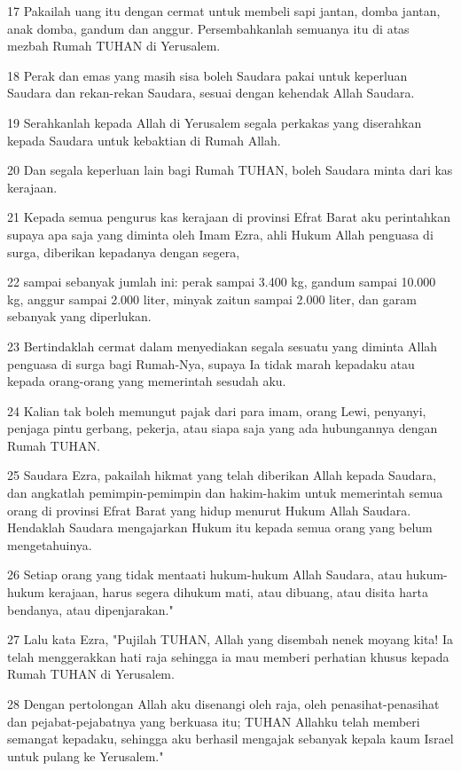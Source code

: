 \par 17 Pakailah uang itu dengan cermat untuk membeli sapi jantan, domba jantan, anak domba, gandum dan anggur. Persembahkanlah semuanya itu di atas mezbah Rumah TUHAN di Yerusalem.
\par 18 Perak dan emas yang masih sisa boleh Saudara pakai untuk keperluan Saudara dan rekan-rekan Saudara, sesuai dengan kehendak Allah Saudara.
\par 19 Serahkanlah kepada Allah di Yerusalem segala perkakas yang diserahkan kepada Saudara untuk kebaktian di Rumah Allah.
\par 20 Dan segala keperluan lain bagi Rumah TUHAN, boleh Saudara minta dari kas kerajaan.
\par 21 Kepada semua pengurus kas kerajaan di provinsi Efrat Barat aku perintahkan supaya apa saja yang diminta oleh Imam Ezra, ahli Hukum Allah penguasa di surga, diberikan kepadanya dengan segera,
\par 22 sampai sebanyak jumlah ini: perak sampai 3.400 kg, gandum sampai 10.000 kg, anggur sampai 2.000 liter, minyak zaitun sampai 2.000 liter, dan garam sebanyak yang diperlukan.
\par 23 Bertindaklah cermat dalam menyediakan segala sesuatu yang diminta Allah penguasa di surga bagi Rumah-Nya, supaya Ia tidak marah kepadaku atau kepada orang-orang yang memerintah sesudah aku.
\par 24 Kalian tak boleh memungut pajak dari para imam, orang Lewi, penyanyi, penjaga pintu gerbang, pekerja, atau siapa saja yang ada hubungannya dengan Rumah TUHAN.
\par 25 Saudara Ezra, pakailah hikmat yang telah diberikan Allah kepada Saudara, dan angkatlah pemimpin-pemimpin dan hakim-hakim untuk memerintah semua orang di provinsi Efrat Barat yang hidup menurut Hukum Allah Saudara. Hendaklah Saudara mengajarkan Hukum itu kepada semua orang yang belum mengetahuinya.
\par 26 Setiap orang yang tidak mentaati hukum-hukum Allah Saudara, atau hukum-hukum kerajaan, harus segera dihukum mati, atau dibuang, atau disita harta bendanya, atau dipenjarakan."
\par 27 Lalu kata Ezra, "Pujilah TUHAN, Allah yang disembah nenek moyang kita! Ia telah menggerakkan hati raja sehingga ia mau memberi perhatian khusus kepada Rumah TUHAN di Yerusalem.
\par 28 Dengan pertolongan Allah aku disenangi oleh raja, oleh penasihat-penasihat dan pejabat-pejabatnya yang berkuasa itu; TUHAN Allahku telah memberi semangat kepadaku, sehingga aku berhasil mengajak sebanyak kepala kaum Israel untuk pulang ke Yerusalem."

